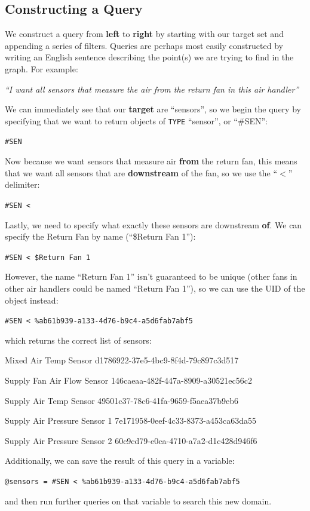 \subsection{Constructing a Query} %
\label{sub:constructing_a_query}
We construct a query from {\bf left} to {\bf right} by starting with our target set and appending a series of filters. Queries are perhaps most easily constructed by writing an English sentence describing the point(s) we are trying to find in the graph. For example:
\begin{center}\emph{``I want all sensors that measure the air from the return fan in this air handler''}\end{center}
We can immediately see that our {\bf target} are ``sensors'', so we begin the query by specifying that we want to return objects of \verb+TYPE+ ``sensor'', or ``\#SEN'':
\begin{center}\verb+#SEN+\end{center}
Now because we want sensors that measure air {\bf from} the return fan, this means that we want all sensors that are {\bf downstream} of the fan, so we use the ``$<$'' delimiter:
\begin{center}\verb+#SEN <+\end{center}
Lastly, we need to specify what exactly these sensors are downstream {\bf of}. We can specify the Return Fan by name (``\$Return Fan 1''):
\begin{center}\verb+#SEN < $Return Fan 1+\end{center}
However, the name ``Return Fan 1'' isn't guaranteed to be unique (other fans in other air handlers could be named ``Return Fan 1''), so we can use the UID of the object instead:
\begin{center}\verb+#SEN < %ab61b939-a133-4d76-b9c4-a5d6fab7abf5+\end{center}
which returns the correct list of sensors:
\begin{center}
	Mixed Air Temp Sensor d1786922-37e5-4bc9-8f4d-79c897c3d517
	
	Supply Fan Air Flow Sensor 146caeaa-482f-447a-8909-a30521ec56c2
	
	Supply Air Temp Sensor 49501c37-78c6-41fa-9659-f5aea37b9eb6
	
	Supply Air Pressure Sensor 1 7e171958-0eef-4c33-8373-a453ca63da55
	
	Supply Air Pressure Sensor 2 60c9cd79-e0ca-4710-a7a2-d1c428d946f6
\end{center}
Additionally, we can save the result of this query in a variable:
\begin{center}\verb+@sensors = #SEN < %ab61b939-a133-4d76-b9c4-a5d6fab7abf5+\end{center}
and then run further queries on that variable to search this new domain.

